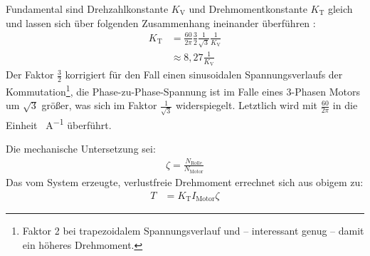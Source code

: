 		Fundamental sind Drehzahlkonstante \(K_\text{V}\) und Drehmomentkonstante \(K_\text{T}\) gleich und lassen sich über folgenden Zusammenhang ineinander überführen \cites{mevey2009sensorless}{DalY.Ohm.2000}{AN885.BLDC.fundamentals}:
		\begin{align}
			K_\text{T}	&= \frac{60}{2\pi} \frac{3}{2} \frac{1}{\sqrt{3}} \frac{1}{K_\text{V}} \nonumber \\
				&\approx 8,27 \frac{1}{K_\text{V}}
			\label{eq:kv to kt}
		\end{align}
		Der Faktor \(\frac{3}{2}\) korrigiert für den Fall einen sinusoidalen Spannungsverlaufs der Kommutation\footnote{\hspace{1mm}Faktor 2 bei trapezoidalem Spannungsverlauf und -- interessant genug -- damit ein höheres Drehmoment.}, die Phase-zu-Phase-Spannung ist im Falle eines 3-Phasen Motors um \(\sqrt{3}\) größer, was sich im Faktor \(\frac{1}{\sqrt{3}}\) widerspiegelt.
		Letztlich wird mit \(\frac{60}{2\pi}\) in die Einheit \unit{\newtonmetre\per\ampere} überführt.\par\medskip
		Die mechanische Untersetzung sei:
		\begin{align}
			\zeta = \frac{N_\text{Rolle}}{N_\text{Motor}}
			\label{eq:reduction}
		\end{align}
		Das vom System erzeugte, verlustfreie Drehmoment errechnet sich aus obigem zu:
		\begin{align}
			T	&= K_\text{T} I_\text{Motor} \zeta
			\label{eq:frictionless torque}
		\end{align}
		
		\nocite{Meschede.2015}\nocite{Demtroder.2018}
